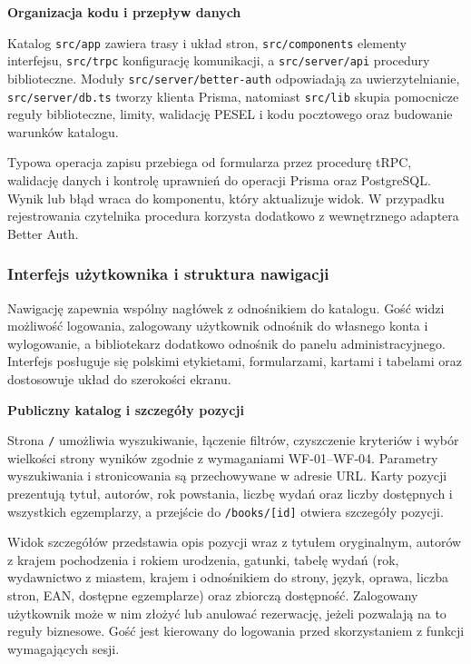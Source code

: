 \documentclass[11pt, a4paper]{article}
\begin{document}
\noindent\textbf{Organizacja kodu i przepływ danych}

Katalog \texttt{src/app} zawiera trasy i układ stron, \texttt{src/components} elementy interfejsu, \texttt{src/trpc} konfigurację komunikacji, a \texttt{src/server/api} procedury biblioteczne. Moduły \texttt{src/server/better-auth} odpowiadają za uwierzytelnianie, \texttt{src/server/db.ts} tworzy klienta Prisma, natomiast \texttt{src/lib} skupia pomocnicze reguły biblioteczne, limity, walidację PESEL i kodu pocztowego oraz budowanie warunków katalogu.

Typowa operacja zapisu przebiega od formularza przez procedurę tRPC, walidację danych i kontrolę uprawnień do operacji Prisma oraz PostgreSQL. Wynik lub błąd wraca do komponentu, który aktualizuje widok. W przypadku rejestrowania czytelnika procedura korzysta dodatkowo z wewnętrznego adaptera Better Auth.

\subsubsection{Interfejs użytkownika i struktura nawigacji}
\label{subsec:interfejs-nawigacja}

Nawigację zapewnia wspólny nagłówek z odnośnikiem do katalogu. Gość widzi możliwość logowania, zalogowany użytkownik odnośnik do własnego konta i wylogowanie, a bibliotekarz dodatkowo odnośnik do panelu administracyjnego. Interfejs posługuje się polskimi etykietami, formularzami, kartami i tabelami oraz dostosowuje układ do szerokości ekranu.

\noindent\textbf{Publiczny katalog i szczegóły pozycji}

Strona \texttt{/} umożliwia wyszukiwanie, łączenie filtrów, czyszczenie kryteriów i wybór wielkości strony wyników zgodnie z wymaganiami WF-01--WF-04. Parametry wyszukiwania i stronicowania są przechowywane w adresie URL. Karty pozycji prezentują tytuł, autorów, rok powstania, liczbę wydań oraz liczby dostępnych i wszystkich egzemplarzy, a przejście do \texttt{/books/[id]} otwiera szczegóły pozycji.

Widok szczegółów przedstawia opis pozycji wraz z tytułem oryginalnym, autorów z krajem pochodzenia i rokiem urodzenia, gatunki, tabelę wydań (rok, wydawnictwo z miastem, krajem i odnośnikiem do strony, język, oprawa, liczba stron, EAN, dostępne egzemplarze) oraz zbiorczą dostępność. Zalogowany użytkownik może w nim złożyć lub anulować rezerwację, jeżeli pozwalają na to reguły biznesowe. Gość jest kierowany do logowania przed skorzystaniem z funkcji wymagających sesji.
\end{document}
